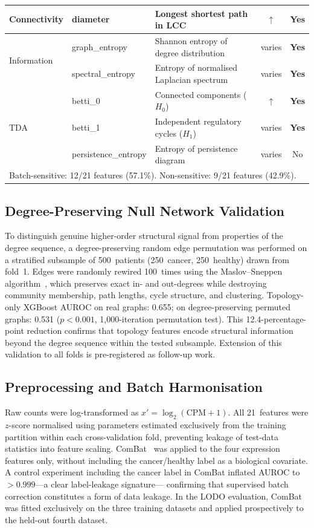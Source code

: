 \documentclass[12pt]{article}
\begin{document}
\begin{table}[H]
\begin{tabular}{llp{5.5cm}cc}
\midrule
Connectivity & diameter & Longest shortest path in LCC          & $\uparrow$   & \textbf{Yes} \\
\midrule
\multirow{2}{*}{Information}
 & graph\_entropy    & Shannon entropy of degree distribution & varies & \textbf{Yes} \\
 & spectral\_entropy & Entropy of normalised Laplacian spectrum& varies & \textbf{Yes} \\
\midrule
\multirow{3}{*}{TDA}
 & betti\_0             & Connected components ($H_0$)          & $\uparrow$   & \textbf{Yes} \\
 & betti\_1             & Independent regulatory cycles ($H_1$) & varies & \textbf{Yes} \\
 & persistence\_entropy & Entropy of persistence diagram        & varies & No  \\
\bottomrule
\multicolumn{5}{l}{\small Batch-sensitive: 12/21 features (57.1\%). Non-sensitive: 9/21 features (42.9\%).}
\end{tabular}
\end{table}

\subsection{Degree-Preserving Null Network Validation}

To distinguish genuine higher-order structural signal from properties
of the degree sequence, a degree-preserving random edge permutation was
performed on a stratified subsample of 500~patients (250~cancer,
250~healthy) drawn from fold~1. Edges were randomly rewired 100~times
using the Maslov--Sneppen algorithm~\citep{maslov2002}, which preserves
exact in- and out-degrees while destroying community membership, path
lengths, cycle structure, and clustering. Topology-only XGBoost AUROC
on real graphs: 0.655; on degree-preserving permuted graphs: 0.531
($p < 0.001$, 1,000-iteration permutation test). This 12.4-percentage-
point reduction confirms that topology features encode structural
information beyond the degree sequence within the tested subsample.
Extension of this validation to all folds is pre-registered as follow-up
work.

\subsection{Preprocessing and Batch Harmonisation}

Raw counts were log-transformed as $x' = \log_2(\text{CPM}+1)$. All
21~features were $z$-score normalised using parameters estimated
exclusively from the training partition within each cross-validation
fold, preventing leakage of test-data statistics into feature scaling.
ComBat~\citep{johnson2007} was applied to the four expression features
only, without including the cancer/healthy label as a biological
covariate. A control experiment including the cancer label in ComBat
inflated AUROC to $>0.999$---a clear label-leakage signature---
confirming that supervised batch correction constitutes a form of
data leakage. In the LODO evaluation, ComBat was fitted exclusively on
the three training datasets and applied prospectively to the held-out
fourth dataset.
\end{document}
